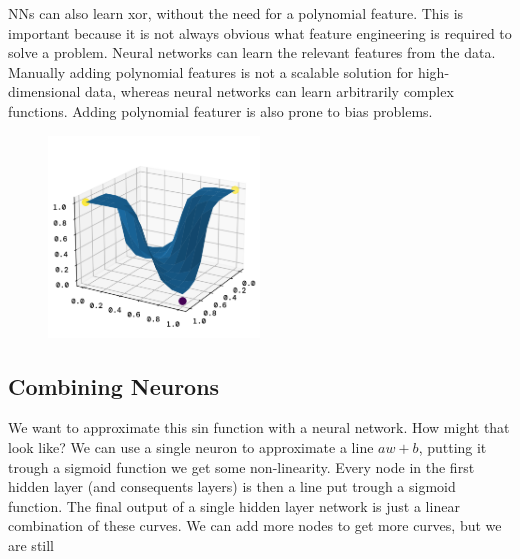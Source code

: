 \documentclass[twoside,11pt]{report}
\begin{document}
\begin{figure}[h]
\begin{minipage}{0.5\textwidth}
\begin{center}
        \caption{}\label{fig:xor_poly}
    \end{center}
\end{minipage}
\end{figure}




NNs can also learn xor, without the need for a polynomial feature. This is important because it is not 
always obvious what feature engineering is required to solve a problem. Neural networks can learn the 
relevant 
features from the data. Manually adding polynomial features is not a scalable solution for 
high-dimensional data,
whereas neural networks can learn arbitrarily complex functions. Adding polynomial featurer 
is also prone to 
bias problems.


\begin{figure}[!h]
    \begin{center}
        \includegraphics[width=0.5\textwidth]{../runsAndFigures/xor_nn.png}
    \end{center}
    \caption{}\label{fig:xor_nn}
\end{figure}



%
\subsection*{Combining Neurons}
\label{app:neuronscombined}

We want to approximate this sin function with a neural network. How might that look like?
We can use a single neuron to approximate a line $a w + b$, putting it trough a sigmoid function
we get some non-linearity. Every node in the first hidden layer (and consequents layers) is then 
a line put trough a sigmoid function. The final output of a single hidden layer network is just
a linear combination of these curves. We can add more nodes to get more curves, but we are still
\end{document}
